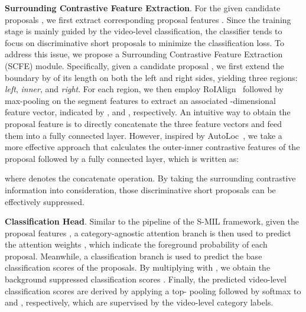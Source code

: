 {\bf Surrounding Contrastive Feature Extraction}.
For the given candidate proposals , we first extract corresponding proposal features .
Since the training stage is mainly guided by the video-level classification, the classifier tends to focus on discriminative short proposals to minimize the classification loss.
To address this issue, we propose a Surrounding Contrastive Feature Extraction (SCFE) module.
Specifically, given a candidate proposal , we first extend the boundary by  of its length on both the left and right sides, yielding three regions: \emph{left}, \emph{inner}, and \emph{right}.
For each region, we then employ RoIAlign~\cite{iccv2017maskrcnn} followed by max-pooling on the segment features  to extract an associated -dimensional feature vector, indicated by ,  and , respectively.
An intuitive way to obtain the proposal feature is to directly concatenate the three feature vectors and feed them into a fully connected layer.
However, inspired by AutoLoc~\cite{eccv2018autoloc}, we take a more effective approach that calculates the outer-inner contrastive features of the proposal followed by a fully connected layer, which is written as:

where  denotes the concatenate operation.
By taking the surrounding contrastive information into consideration, those discriminative short proposals can be effectively suppressed.


{\bf Classification Head}.
Similar to the pipeline of the S-MIL framework, given the proposal features , a category-agnostic attention branch is then used to predict the attention weights , which indicate the foreground probability of each proposal.
Meanwhile, a classification branch is used to predict the base classification scores  of the proposals.
By multiplying  with , we obtain the background suppressed classification scores .
Finally, the predicted video-level classification scores  are derived by applying a top- pooling followed by softmax to  and , respectively, which are supervised by the video-level category labels.




